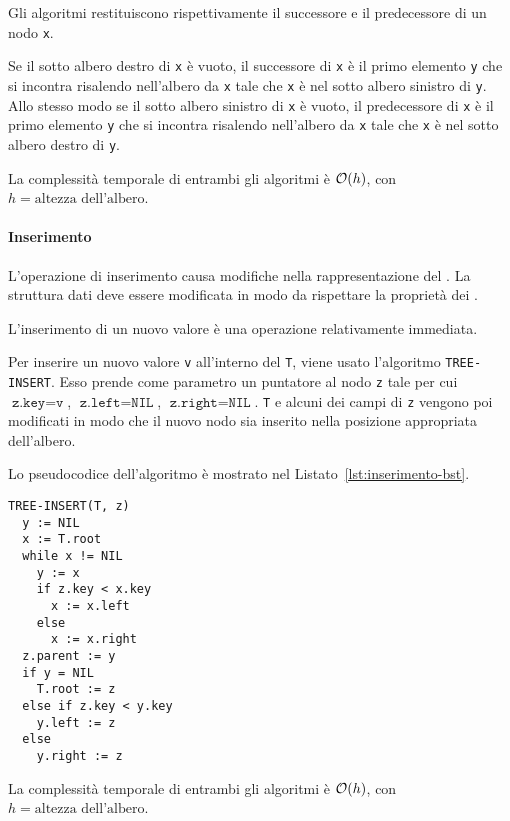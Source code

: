 \documentclass[italian, 10pt]{article}
\begin{document}
Gli algoritmi restituiscono rispettivamente il successore e il predecessore di un nodo \texttt{x}.

\bigskip
Se il sotto albero destro di \texttt{x} è vuoto, il successore di \texttt{x} è il primo elemento \texttt{y} che si incontra risalendo nell'albero da \texttt{x} tale che \texttt{x} è nel sotto albero sinistro di \texttt{y}.
Allo stesso modo se il sotto albero sinistro di \texttt{x} è vuoto, il predecessore di \texttt{x} è il primo elemento \texttt{y} che si incontra risalendo nell'albero da \texttt{x} tale che \texttt{x} è nel sotto albero destro di \texttt{y}.

\bigskip
La complessità temporale di entrambi gli algoritmi è \(\mathcal{O}(h)\), con \(h = \text{altezza dell'albero}\).

\paragraph{Inserimento}
\label{par:inserimento-bst}

L'operazione di inserimento causa modifiche nella rappresentazione del \BST.
La struttura dati deve essere modificata in modo da rispettare la proprietà dei \BST.

L'inserimento di un nuovo valore è una operazione relativamente immediata.

Per inserire un nuovo valore \texttt{v} all'interno del \BST \texttt{T}, viene usato l'algoritmo \texttt{TREE-INSERT}.
Esso prende come parametro un puntatore al nodo \texttt{z} tale per cui \(\texttt{z.key} = \texttt{v}\), \(\texttt{z.left} = \texttt{NIL}\), \(\texttt{z.right} = \texttt{NIL}\).
\texttt{T} e alcuni dei campi di \texttt{z} vengono poi modificati in modo che il nuovo nodo sia inserito nella posizione appropriata dell'albero.

\bigskip
Lo pseudocodice dell'algoritmo è mostrato nel Listato~\ref{lst:inserimento-bst}.

\begin{lstlisting}[style=pseudocode, caption={Inserimento di un nuovo nodo}, label={lst:inserimento-bst}]
TREE-INSERT(T, z)
  y := NIL
  x := T.root
  while x != NIL
    y := x
    if z.key < x.key
      x := x.left
    else
      x := x.right
  z.parent := y
  if y = NIL
    T.root := z
  else if z.key < y.key
    y.left := z
  else
    y.right := z
\end{lstlisting}

\bigskip
La complessità temporale di entrambi gli algoritmi è \(\mathcal{O}(h)\), con \(h = \text{altezza dell'albero}\).
\end{document}

